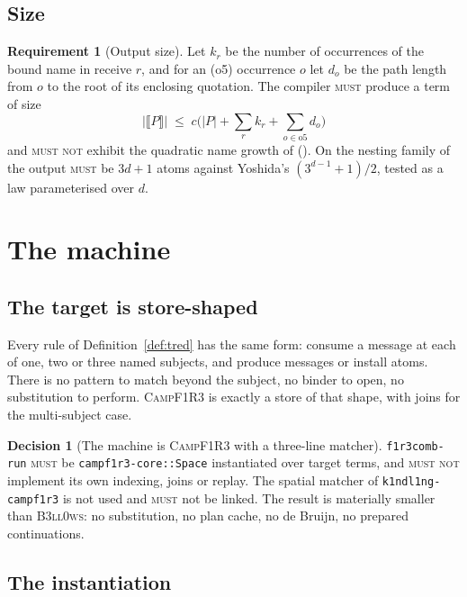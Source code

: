 \documentclass[11pt,a4paper]{article}
\newcommand{\code}[1]{\texttt{#1}}
\newcommand{\Camp}{\textsc{CampF1R3}}
\newcommand{\Bell}{\textsc{B3ll0ws}}
\newcommand{\MUST}{\textsc{must}}
\newcommand{\MUSTNOT}{\textsc{must not}}
\newcommand{\enc}[1]{\llbracket #1 \rrbracket}
\theoremstyle{definition}
\newtheorem{requirement}[definition]{Requirement}
\newtheorem{decision}[definition]{Decision}
\theoremstyle{plain}
\begin{document}
\subsection{Size}

\begin{requirement}[Output size]\label{req:size}
Let $k_{r}$ be the number of occurrences of the bound name in receive $r$, and
for an (o5) occurrence $o$ let $d_{o}$ be the path length from $o$ to the root
of its enclosing quotation. The compiler \MUST{} produce a term of size
\[
  |\enc{P}| \;\leq\; c\Big(|P| + \sum_{r} k_{r} + \sum_{o \in \mathrm{o5}} d_{o}\Big)
\]
and \MUSTNOT{} exhibit the quadratic name growth of \cite{rhocomb}
(\cite[Rem.~6.3]{draft3}). On the nesting family of
\cite[Prop.~8.2]{draft3} the output \MUST{} be $3d+1$ atoms against Yoshida's
$(3^{d-1}+1)/2$, tested as a law parameterised over $d$.
\end{requirement}

\section{The machine}\label{sec:runtime}

\subsection{The target is store-shaped}

Every rule of Definition~\ref{def:tred} has the same form: consume a message
at each of one, two or three named subjects, and produce messages or install
atoms. There is no pattern to match beyond the subject, no binder to open, no
substitution to perform. \Camp{} is exactly a store of that shape, with joins
for the multi-subject case.

\begin{decision}[The machine is \Camp{} with a three-line matcher]
\label{dec:machine}
\code{f1r3comb-run} \MUST{} be \code{campf1r3-core::Space} instantiated over
target terms, and \MUSTNOT{} implement its own indexing, joins or replay. The
spatial matcher of \code{k1ndl1ng-campf1r3} is not used and \MUST{} not be
linked. The result is materially smaller than \Bell: no substitution, no plan
cache, no de Bruijn, no prepared continuations.
\end{decision}

\subsection{The instantiation}
\end{document}
